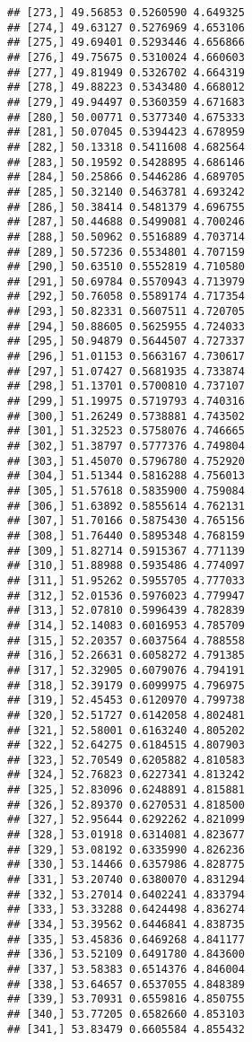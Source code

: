 \documentclass[]{book}
\theoremstyle{definition}
\theoremstyle{definition}
\theoremstyle{definition}
\theoremstyle{remark}
\begin{document}
\begin{verbatim}
## [273,] 49.56853 0.5260590 4.649325
## [274,] 49.63127 0.5276969 4.653106
## [275,] 49.69401 0.5293446 4.656866
## [276,] 49.75675 0.5310024 4.660603
## [277,] 49.81949 0.5326702 4.664319
## [278,] 49.88223 0.5343480 4.668012
## [279,] 49.94497 0.5360359 4.671683
## [280,] 50.00771 0.5377340 4.675333
## [281,] 50.07045 0.5394423 4.678959
## [282,] 50.13318 0.5411608 4.682564
## [283,] 50.19592 0.5428895 4.686146
## [284,] 50.25866 0.5446286 4.689705
## [285,] 50.32140 0.5463781 4.693242
## [286,] 50.38414 0.5481379 4.696755
## [287,] 50.44688 0.5499081 4.700246
## [288,] 50.50962 0.5516889 4.703714
## [289,] 50.57236 0.5534801 4.707159
## [290,] 50.63510 0.5552819 4.710580
## [291,] 50.69784 0.5570943 4.713979
## [292,] 50.76058 0.5589174 4.717354
## [293,] 50.82331 0.5607511 4.720705
## [294,] 50.88605 0.5625955 4.724033
## [295,] 50.94879 0.5644507 4.727337
## [296,] 51.01153 0.5663167 4.730617
## [297,] 51.07427 0.5681935 4.733874
## [298,] 51.13701 0.5700810 4.737107
## [299,] 51.19975 0.5719793 4.740316
## [300,] 51.26249 0.5738881 4.743502
## [301,] 51.32523 0.5758076 4.746665
## [302,] 51.38797 0.5777376 4.749804
## [303,] 51.45070 0.5796780 4.752920
## [304,] 51.51344 0.5816288 4.756013
## [305,] 51.57618 0.5835900 4.759084
## [306,] 51.63892 0.5855614 4.762131
## [307,] 51.70166 0.5875430 4.765156
## [308,] 51.76440 0.5895348 4.768159
## [309,] 51.82714 0.5915367 4.771139
## [310,] 51.88988 0.5935486 4.774097
## [311,] 51.95262 0.5955705 4.777033
## [312,] 52.01536 0.5976023 4.779947
## [313,] 52.07810 0.5996439 4.782839
## [314,] 52.14083 0.6016953 4.785709
## [315,] 52.20357 0.6037564 4.788558
## [316,] 52.26631 0.6058272 4.791385
## [317,] 52.32905 0.6079076 4.794191
## [318,] 52.39179 0.6099975 4.796975
## [319,] 52.45453 0.6120970 4.799738
## [320,] 52.51727 0.6142058 4.802481
## [321,] 52.58001 0.6163240 4.805202
## [322,] 52.64275 0.6184515 4.807903
## [323,] 52.70549 0.6205882 4.810583
## [324,] 52.76823 0.6227341 4.813242
## [325,] 52.83096 0.6248891 4.815881
## [326,] 52.89370 0.6270531 4.818500
## [327,] 52.95644 0.6292262 4.821099
## [328,] 53.01918 0.6314081 4.823677
## [329,] 53.08192 0.6335990 4.826236
## [330,] 53.14466 0.6357986 4.828775
## [331,] 53.20740 0.6380070 4.831294
## [332,] 53.27014 0.6402241 4.833794
## [333,] 53.33288 0.6424498 4.836274
## [334,] 53.39562 0.6446841 4.838735
## [335,] 53.45836 0.6469268 4.841177
## [336,] 53.52109 0.6491780 4.843600
## [337,] 53.58383 0.6514376 4.846004
## [338,] 53.64657 0.6537055 4.848389
## [339,] 53.70931 0.6559816 4.850755
## [340,] 53.77205 0.6582660 4.853103
## [341,] 53.83479 0.6605584 4.855432

\end{verbatim}
\end{document}
